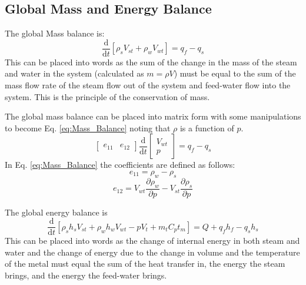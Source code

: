     \subsection{Global Mass and Energy Balance}
    
        The global Mass balance is: 
        $$\frac{\mathrm{d} }{\mathrm{d} t}\left [ \rho_s V_{st} + \rho_w V_{wt}\right ] = q_f - q_s$$\cite{Astrom}
        This can be placed into words as the sum of the change in the mass of the steam and water in the system (calculated as $m = \rho V$) must be equal to the sum of the mass flow rate of the steam flow out of the system and feed-water flow into the system. This is the principle of the conservation of mass. 
        
        The global mass balance can be placed into matrix form with some manipulations to become Eq. \eqref{eq:Mass_Balance} noting that $\rho$ is a function of $p$. \cite{Astrom}
        \begin{equation}
            \label{eq:Mass_Balance}
            \left [ \begin{matrix} e_{11}& e_{12}\end{matrix} \right ] \frac{\mathrm{d} }{\mathrm{d} t} \left [ \begin{matrix} V_{wt}\\ p\end{matrix} \right ] = q_f  - q_s
        \end{equation}
        In Eq. \ref{eq:Mass_Balance} the coefficients are defined as follows:
        \begin{equation*}
                e_{11}      = \rho_w - \rho_s
        \end{equation*}
        \begin{equation*}
                e_{12}      = V_{wt} \frac{\partial \rho_w }{\partial p} - V_{st} \frac{\partial \rho_s }{\partial p}
        \end{equation*}
        
        The global energy balance is 
        $$\frac{\mathrm{d} }{\mathrm{d} t}\left [ \rho_s h_s V_{st} + \rho_w h_w V_{wt} - pV_t + m_tC_pt_m\right ] = Q + q_f h_f - q_s h_s $$\cite{Astrom}
        This can be placed into words as the change of internal energy in both steam and water and the change of energy due to the change in volume and the temperature of the metal must equal the sum of the heat transfer in, the energy the steam brings, and the energy the feed-water brings. 
        

